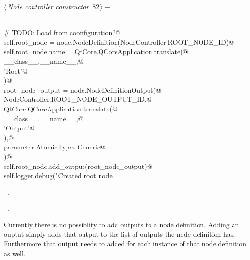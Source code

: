 \documentclass[
    a4paper,      %
    10pt,         %
    openright,    %
    notitlepage,  %
    parskip=half, %
]{scrreprt}       %
\theoremstyle{definition}                    %
\begin{document}
\begin{flushleft} \small
\begin{minipage}{\linewidth}\label{scrap132}\raggedright\small
{} $\langle\,${\itshape Node controller constructor}\nobreak\ {\footnotesize {82}}$\,\rangle\equiv$
\vspace{-1exm}
\begin{list}{}{} \item
\mbox{}\lstinline@@\\
\mbox{}\lstinline@    # TODO: Load from coonfiguration?@\\
\mbox{}\lstinline@    self.root_node = node.NodeDefinition(NodeController.ROOT_NODE_ID)@\\
\mbox{}\lstinline@    self.root_node.name = QtCore.QCoreApplication.translate(@\\
\mbox{}\lstinline@        __class__.__name__,@\\
\mbox{}\lstinline@        'Root'@\\
\mbox{}\lstinline@    )@\\
\mbox{}\lstinline@    root_node_output = node.NodeDefinitionOutput(@\\
\mbox{}\lstinline@        NodeController.ROOT_NODE_OUTPUT_ID,@\\
\mbox{}\lstinline@        QtCore.QCoreApplication.translate(@\\
\mbox{}\lstinline@            __class__.__name__,@\\
\mbox{}\lstinline@            'Output'@\\
\mbox{}\lstinline@        ),@\\
\mbox{}\lstinline@        parameter.AtomicTypes.Generic@\\
\mbox{}\lstinline@    )@\\
\mbox{}\lstinline@    self.root_node.add_output(root_node_output)@\\
\mbox{}\lstinline@    self.logger.debug("Created root node %s", NodeController.ROOT_NODE_ID)@{\NWsep}
\end{list}
\vspace{-1.5ex}
\footnotesize
\begin{list}{}{\setlength{\itemsep}{-\parsep}\setlength{\itemindent}{-\leftmargin}}
\item \NWtxtMacroDefBy\ .
\item \NWtxtMacroRefIn\ .

\item{}
\end{list}
\end{minipage}\vspace{4ex}
\end{flushleft}
Currently there is no possiblity to add outputs to a node definition. Adding an
ouptut simply adds that output to the list of outputs the node definition has.
Furthermore that output needs to added for each instance of that node
definition as well.
\end{document}
